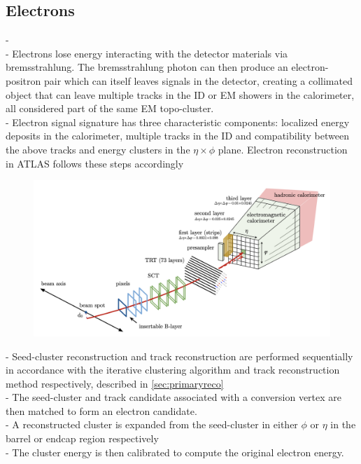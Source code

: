 \documentclass[../thesis.tex]{subfiles}
\begin{document}
\subsection{Electrons}
- \citep{reco:electron_id}\citep{reco:electron_meas}\\
- Electrons lose energy interacting with the detector materials via bremsstrahlung. The bremsstrahlung photon can then produce an electron-positron pair which can itself leaves signals in the detector, creating a collimated object that can leave multiple tracks in the ID or EM showers in the calorimeter, all considered part of the same EM topo-cluster.\\
- Electron signal signature has three characteristic components: localized energy deposits in the calorimeter, multiple tracks in the ID and compatibility between the above tracks and energy clusters in the $\eta \times \phi$ plane. Electron reconstruction in ATLAS follows these steps accordingly
\begin{figure}[!htbp]
\begin{center}
\includegraphics[width=\linewidth]{fig/reco_electron.png}
\caption{\label{fig:reco:electron}\citep{reco:electron_id}}
\end{center}
\end{figure}
- Seed-cluster reconstruction and track reconstruction are performed sequentially in accordance with the iterative clustering algorithm and track reconstruction method respectively, described in \autoref{sec:primaryreco}\\
- The seed-cluster and track candidate associated with a conversion vertex are then matched to form an electron candidate.\\
- A reconstructed cluster is expanded from the seed-cluster in either $\phi$ or $\eta$ in the barrel or endcap region respectively\\
- The cluster energy is then calibrated to compute the original electron energy.
\end{document}
